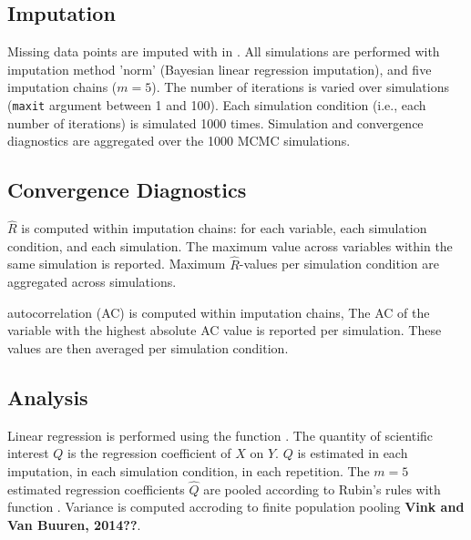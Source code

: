 \documentclass[article]{jss}
\newcommand{\fct}[1]{\code{#1()}}
\begin{document}
\subsection{Imputation}
Missing data points are imputed with  in . All simulations are performed with imputation method 'norm' (Bayesian linear regression imputation), and five imputation chains ($m = 5$). The number of iterations is varied over simulations (\texttt{maxit} argument between 1 and 100). Each simulation condition (i.e., each number of iterations) is simulated 1000 times. Simulation and convergence diagnostics are aggregated over the 1000 MCMC simulations. 

\subsection{Convergence Diagnostics}

$\widehat{R}$ is computed within imputation chains: for each variable, each simulation condition, and each simulation. The maximum value across variables within the same simulation is reported. Maximum $\widehat{R}$-values per simulation condition are aggregated across simulations.

autocorrelation (AC) is computed within imputation chains,  The AC of the variable with the highest absolute AC value is reported per simulation. These values are then averaged per simulation condition.


\subsection{Analysis}

Linear regression is performed using the  function \fct{lm}. The quantity of scientific interest $Q$ is the regression coefficient of $X$ on $Y$. $Q$ is estimated in each imputation, in each simulation condition, in each repetition. The $m = 5$ estimated regression coefficients $\hat{Q}$ are pooled according to Rubin's \citeyear{rubin87} rules with  function \fct{pool}. Variance is computed accroding to finite population pooling \textbf{Vink and Van Buuren, 2014??}.
\end{document}
